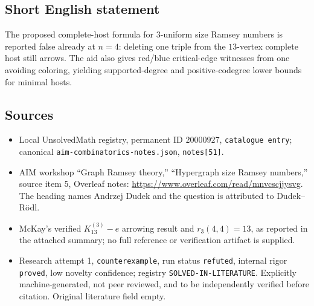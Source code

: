 \documentclass[11pt]{article}
\begin{document}
\subsection{Short English statement}
The proposed complete-host formula for $3$-uniform size Ramsey numbers is reported false already at $n=4$: deleting one triple from the $13$-vertex complete host still arrows. The aid also gives red/blue critical-edge witnesses from one avoiding coloring, yielding supported-degree and positive-codegree lower bounds for minimal hosts.
\subsection{Sources}
\begin{itemize}
\item Local UnsolvedMath registry, permanent ID $20000927$, \texttt{catalogue entry}; canonical \texttt{aim-combinatorics-notes.json}, \texttt{notes[51]}.
\item AIM workshop ``Graph Ramsey theory,'' ``Hypergraph size Ramsey numbers,'' source item 5, Overleaf notes: \url{https://www.overleaf.com/read/mnvcscjjysvg}. The heading names Andrzej Dudek and the question is attributed to Dudek--R\"odl.
\item McKay's verified $K_{13}^{(3)}-e$ arrowing result and $r_3(4,4)=13$, as reported in the attached summary; no full reference or verification artifact is supplied.
\item Research attempt 1, \texttt{counterexample}, run status \texttt{refuted}, internal rigor \texttt{proved}, low novelty confidence; registry \texttt{SOLVED-IN-LITERATURE}. Explicitly machine-generated, not peer reviewed, and to be independently verified before citation. Original literature field empty.
\end{itemize}
\end{document}
